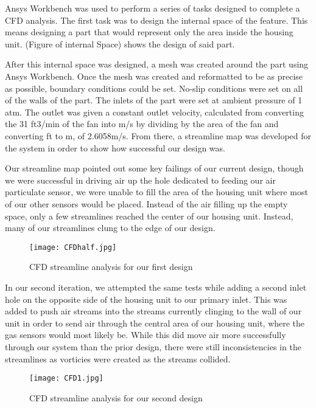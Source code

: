 Ansys Workbench was used to perform a series of tasks designed to complete a CFD analysis. The first task was to design the internal space of the feature. This means designing a part that would represent only the area inside the housing unit. (Figure of internal Space) shows the design of said part.

After this internal space was designed, a mesh was created around the part using Ansys Workbench. Once the mesh was created and reformatted to be as precise as possible, boundary conditions could be set. No-slip conditions were set on all of the walls of the part. The inlets of the part were set at ambient pressure of 1 atm. The outlet was given a constant outlet velocity, calculated from converting the 31 ft3/min of the fan into m/s by dividing by the area of the fan and converting ft to m, of 2.6058m/s. From there, a streamline map was developed for the system in order to show how successful our design was.

Our streamline map pointed out some key failings of our current design, though we were successful in driving air up the hole dedicated to feeding our air particulate sensor, we were unable to fill the area of the housing unit where most of our other sensors would be placed. Instead of the air filling up the empty space, only a few streamlines reached the center of our housing unit. Instead, many of our streamlines clung to the edge of our design.

\begin{figure}[H]
	\centering
	\texttt{[image: CFDhalf.jpg]}
	\caption{CFD streamline analysis for our first design}
	\label{fig:CFD1}
\end{figure}

In our second iteration, we attempted the same tests while adding a second inlet hole on the opposite side of the housing unit to our primary inlet. This was added to push air streams into the streams currently clinging to the wall of our unit in order to send air through the central area of our housing unit, where the gas sensors would most likely be. While this did move air more successfully through our system than the prior design, there were still inconsistencies in the streamlines as vorticies were created as the streams collided.

\begin{figure}[H]
	\centering
	\texttt{[image: CFD1.jpg]}
	\caption{CFD streamline analysis for our second design}
	\label{fig:CFD2}
\end{figure}

